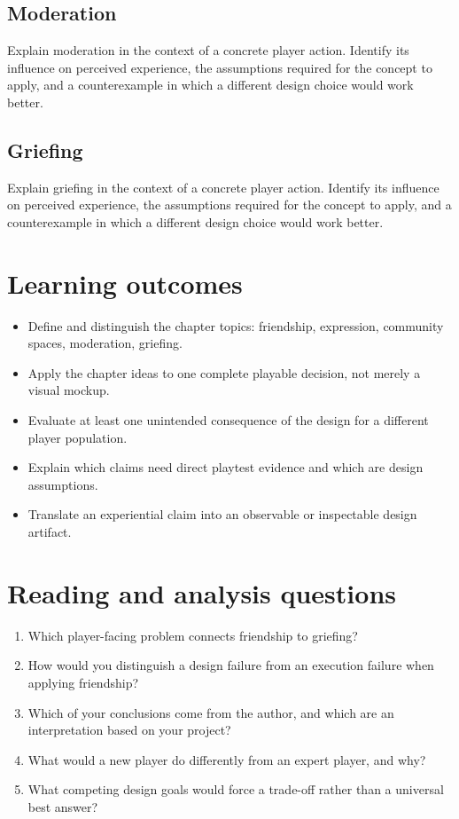 \documentclass[11pt]{article}
\begin{document}
\subsection{Moderation}
Explain moderation in the context of a concrete player action. Identify its influence on perceived experience, the assumptions required for the concept to apply, and a counterexample in which a different design choice would work better.


\subsection{Griefing}
Explain griefing in the context of a concrete player action. Identify its influence on perceived experience, the assumptions required for the concept to apply, and a counterexample in which a different design choice would work better.


\section{Learning outcomes}
\begin{itemize}
\item Define and distinguish the chapter topics: friendship, expression, community spaces, moderation, griefing.
\item Apply the chapter ideas to one complete playable decision, not merely a visual mockup.
\item Evaluate at least one unintended consequence of the design for a different player population.
\item Explain which claims need direct playtest evidence and which are design assumptions.
\item Translate an experiential claim into an observable or inspectable design artifact.
\end{itemize}

\section{Reading and analysis questions}
\begin{enumerate}
\item Which player-facing problem connects friendship to griefing?
\item How would you distinguish a design failure from an execution failure when applying friendship?
\item Which of your conclusions come from the author, and which are an interpretation based on your project?
\item What would a new player do differently from an expert player, and why?
\item What competing design goals would force a trade-off rather than a universal best answer?
\end{enumerate}
\end{document}
